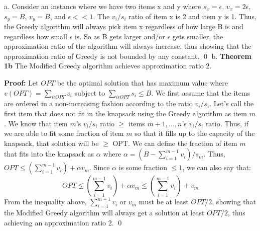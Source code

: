 \documentclass[oneside]{homework} %
\begin{document}
\maketitle
\skipevenpage

{\large a.} Consider an instance where we have two items x and y where $s_x = \epsilon$, $v_x = 2\epsilon$, $s_y = B$, $v_y =B$, and $\epsilon << 1$. The $v_i/s_i$ ratio of item x is 2 and item y is 1. Thus, the Greedy algorithm will always pick item x regardless of how large B is and regardless how small $\epsilon$ is. So as B gets larger and/or $\epsilon$ gets smaller, the approximation ratio of the algorithm will always increase, thus showing that the approximation ratio of Greedy is not bounded by any constant. \hfill\qed
\newline
\newline
{\large b.} \textbf{Theorem 1b} The Modified Greedy algorithm achieves approximation ratio 2.
\newline

\textbf{Proof:} Let $OPT$ be the optimal solution that has maximum value where $v(OPT) = \sum\limits_{i\epsilon OPT}v_i$ subject to $\sum\limits_{i\epsilon OPT}s_i \leq B$. We first assume that the items are ordered in a non-increasing fashion according to the ratio $v_i/s_i$. Let's call the first item that does not fit in the knapsack using the Greedy algorithm as item $m$. We know that item $m$'s $v_i/s_i$ ratio $\geq$ items $m+1,...,n$'s $v_i/s_i$ ratio. Thus, if we are able to fit some fraction of item $m$ so that it fills up to the capacity of the knapsack, that solution will be $\geq$ OPT. We can define the fraction of item $m$ that fits into the knapsack as $\alpha$ where $\alpha = (B - \sum\limits_{i=1}^{m-1} v_i) / s_m$. Thus, $OPT \leq (\sum\limits_{i=1}^{m-1} v_i) + \alpha v_m$. Since $\alpha$ is some fraction $\leq 1$, we can also say that: $$OPT \leq (\sum\limits_{i=1}^{m-1} v_i) + \alpha v_m \leq (\sum\limits_{i=1}^{m-1} v_i) + v_m$$ From the inequality above, $\sum\limits_{i=1}^{m-1} v_i$ or $v_m$ must be at least $OPT/2$, showing that the Modified Greedy algorithm will always get a solution at least $OPT/2$, thus achieving an approximation ratio 2. \hfill\qed
\end{document}
